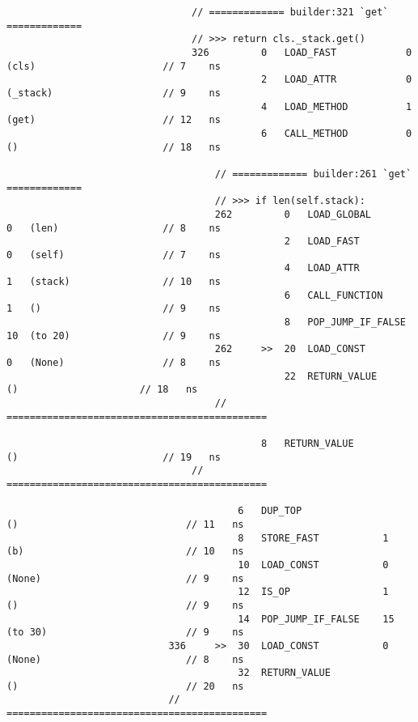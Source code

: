\begin{code}
\begin{verbatim}
                                // ============= builder:321 `get` =============
                                // >>> return cls._stack.get()
                                326         0   LOAD_FAST            0   (cls)                      // 7    ns
                                            2   LOAD_ATTR            0   (_stack)                   // 9    ns
                                            4   LOAD_METHOD          1   (get)                      // 12   ns
                                            6   CALL_METHOD          0   ()                         // 18   ns

                                    // ============= builder:261 `get` =============
                                    // >>> if len(self.stack):
                                    262         0   LOAD_GLOBAL          0   (len)                  // 8    ns
                                                2   LOAD_FAST            0   (self)                 // 7    ns
                                                4   LOAD_ATTR            1   (stack)                // 10   ns
                                                6   CALL_FUNCTION        1   ()                     // 9    ns
                                                8   POP_JUMP_IF_FALSE    10  (to 20)                // 9    ns
                                    262     >>  20  LOAD_CONST           0   (None)                 // 8    ns
                                                22  RETURN_VALUE             ()                     // 18   ns
                                    // =============================================

                                            8   RETURN_VALUE             ()                         // 19   ns
                                // =============================================

                                        6   DUP_TOP                  ()                             // 11   ns
                                        8   STORE_FAST           1   (b)                            // 10   ns
                                        10  LOAD_CONST           0   (None)                         // 9    ns
                                        12  IS_OP                1   ()                             // 9    ns
                                        14  POP_JUMP_IF_FALSE    15  (to 30)                        // 9    ns
                            336     >>  30  LOAD_CONST           0   (None)                         // 8    ns
                                        32  RETURN_VALUE             ()                             // 20   ns
                            // =============================================


\end{verbatim}
\end{code}
